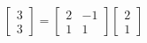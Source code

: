 \documentclass[preview]{standalone}
\begin{document}
\begin{align*}
\begin{bmatrix} 3 \\ 3 \end{bmatrix} = \begin{bmatrix} 2 & -1 \\ 1 & 1 \end{bmatrix} \begin{bmatrix} 2 \\ 1 \end{bmatrix}
\end{align*}
\end{document}
